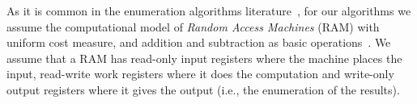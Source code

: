 As it is common in the enumeration algorithms literature~\cite{Bagan06,Courcelle09,Segoufin13}, for our algorithms we assume the computational model of \emph{Random Access Machines} (RAM) with uniform cost measure, and addition and subtraction as basic operations~\cite{AhoHU74}. We assume that a RAM has read-only input registers where the machine places the input, read-write work registers where it does the computation and write-only output registers where it gives the output (i.e., the enumeration of the results).
